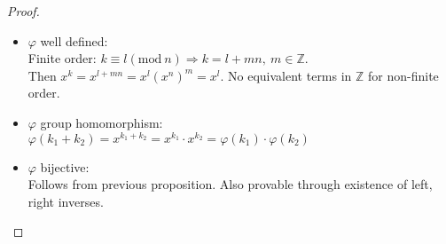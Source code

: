 \documentclass{article}
\theoremstyle{definition}
\theoremstyle{remark}
\begin{document}
\begin{proof}~
\begin{itemize}
\item $\varphi $ well defined:\\
Finite order: $k\equiv l (\mathrm{mod}~n)\Rightarrow k=l+mn,~m\in\mathbb{Z}.$\\
Then $x^k=x^{l+mn}=x^l(x^n)^m=x^l$. No equivalent terms in $\mathbb{Z}$ for non-finite order.
\item $\varphi$ group homomorphism:\\
$\varphi(k_1+k_2)=x^{k_1+k_2}=x^{k_1}\cdot x^{k_2}=\varphi(k_1)\cdot\varphi(k_2)$
\item  $\varphi$ bijective:\\
Follows from previous proposition. Also provable through existence of left, right inverses.
\end{itemize}
\end{proof}
\newpage
\end{document}
